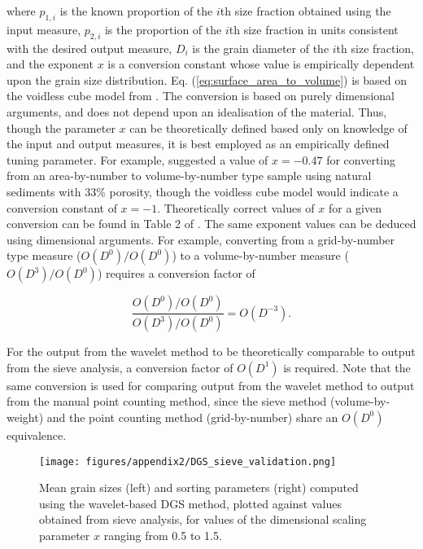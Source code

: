 \documentclass[jmse,article,submit,pdftex,moreauthors]{Definitions/mdpi}
\begin{document}
\noindent where $p_{1,i}$ is the known proportion of the $i$th size fraction obtained using the input measure, $p_{2,i}$ is the proportion of the $i$th size fraction in units consistent with the desired output measure, $D_i$ is the grain diameter of the $i$th size fraction, and the exponent $x$ is a conversion constant whose value is empirically dependent upon the grain size distribution. Eq. (\ref{eq:surface_area_to_volume}) is based on the voidless cube model from \citet{Kellerhals_Bray1971}. The \citet{Kellerhals_Bray1971} conversion is based on purely dimensional arguments, and does not depend upon an idealisation of the material. Thus, though the parameter $x$ can be theoretically defined based only on knowledge of the input and output measures, it is best employed as an empirically defined tuning parameter. For example, \citet{Diplas_Sutherland1988} suggested a value of $x=-0.47$ for converting from an area-by-number to volume-by-number type sample using natural sediments with 33\% porosity, though the voidless cube model would indicate a conversion constant of $x=-1$. Theoretically correct values of $x$ for a given conversion can be found in Table 2 of \citet{Kellerhals_Bray1971}. The same exponent values can be deduced using dimensional arguments. For example, converting from a grid-by-number type measure ($O(D^0)/O(D^0)$) to a volume-by-number measure ($O(D^3)/O(D^0)$) requires a conversion factor of 

\begin{equation}\label{eq:order_balance}
\frac{O(D^0)/O(D^0)}{O(D^3)/O(D^0)} = O(D^{-3}).
\end{equation} 

For the output from the wavelet method to be theoretically comparable to output from the sieve analysis, a conversion factor of $O(D^1)$ is required. Note that the same conversion is used for comparing output from the wavelet method to output from the manual point counting method, since the sieve method (volume-by-weight) and the point counting method (grid-by-number) share an $O(D^0)$ equivalence. 

\begin{figure}
	\texttt{[image: figures/appendix2/DGS\_sieve\_validation.png]}
	\caption[Mean grain size and sorting: wavelet method versus sieve]{Mean grain sizes (left) and sorting parameters (right) computed using the wavelet-based DGS method, plotted against values obtained from sieve analysis, for values of the dimensional scaling parameter $x$ ranging from 0.5 to 1.5. \label{fig:validation_sieve}}
\end{figure}
\end{document}
